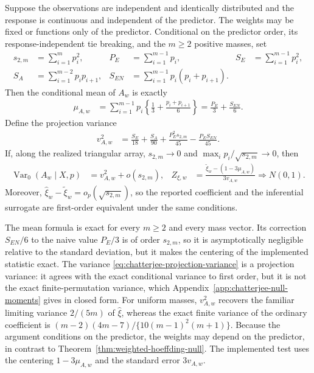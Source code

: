 \begin{theorem}
\label{thm:weighted-chatterjee-null}
Suppose the observations are independent and identically distributed and the
response is continuous and independent of the predictor. The weights may be
fixed or functions only of the predictor. Conditional on the predictor order,
its response-independent tie breaking, and the $m\geq2$ positive masses, set
\begin{align*}
  s_{2,m}
  &=\sum_{i=1}^m p_i^2,
  &P_E
  &=\sum_{i=1}^{m-1}p_i,
  &
  S_E
  &=\sum_{i=1}^{m-1}p_i^2,\\
  S_A
  &=\sum_{i=1}^{m-2}p_ip_{i+1},
  &
  S_{EN}
  &=\sum_{i=1}^{m-1}p_i(p_i+p_{i+1}).
\end{align*}
Then the conditional mean of $A_w$ is exactly
\begin{align}
  \mu_{A,w}
  &=\sum_{i=1}^{m-1}p_i
    \left\{\frac13+\frac{p_i+p_{i+1}}6\right\}
   =\frac{P_E}{3}+\frac{S_{EN}}6.
  \label{eq:chatterjee-null-mean}
\end{align}
Define the projection variance
\begin{align}
  v_{A,w}^2
  &=\frac{S_E}{18}+\frac{S_A}{90}
    +\frac{P_E^2s_{2,m}}{45}
    -\frac{P_ES_{EN}}{45}.
  \label{eq:chatterjee-projection-variance}
\end{align}
If, along the realized triangular array, $s_{2,m}\to0$ and
$\max_ip_i/\sqrt{s_{2,m}}\to0$, then
\begin{align*}
  \operatorname{Var}_0(A_w\mid X,p)
  &=v_{A,w}^2+o(s_{2,m}),
  &
  Z_{\xi,w}
  &=\frac{
      \widetilde\xi_w-(1-3\mu_{A,w})
    }{3v_{A,w}}
  \mathrel{\Longrightarrow}N(0,1).
\end{align*}
Moreover, $\widehat\xi_w-\widetilde\xi_w=o_p(\sqrt{s_{2,m}})$, so the
reported coefficient and the inferential surrogate are first-order equivalent
under the same conditions.
\end{theorem}

The mean formula is exact for every $m\geq2$ and every mass vector. Its
correction $S_{EN}/6$ to the naive value $P_E/3$ is of order $s_{2,m}$, so it
is asymptotically negligible relative to the standard deviation, but it makes
the centering of the implemented statistic exact. The variance
\eqref{eq:chatterjee-projection-variance} is a projection variance: it agrees
with the exact conditional variance to first order, but it is not the exact
finite-permutation variance, which
Appendix~\ref{app:chatterjee-null-moments} gives in closed form. For uniform
masses, $v_{A,w}^2$ recovers the familiar limiting variance $2/(5m)$ of
$\widehat\xi$, whereas the exact finite variance of the ordinary coefficient
is $(m-2)(4m-7)/\{10(m-1)^2(m+1)\}$. Because the argument conditions on the
predictor, the weights may depend on the predictor, in contrast to
Theorem~\ref{thm:weighted-hoeffding-null}. The implemented test uses the
centering $1-3\mu_{A,w}$ and the standard error $3v_{A,w}$.

